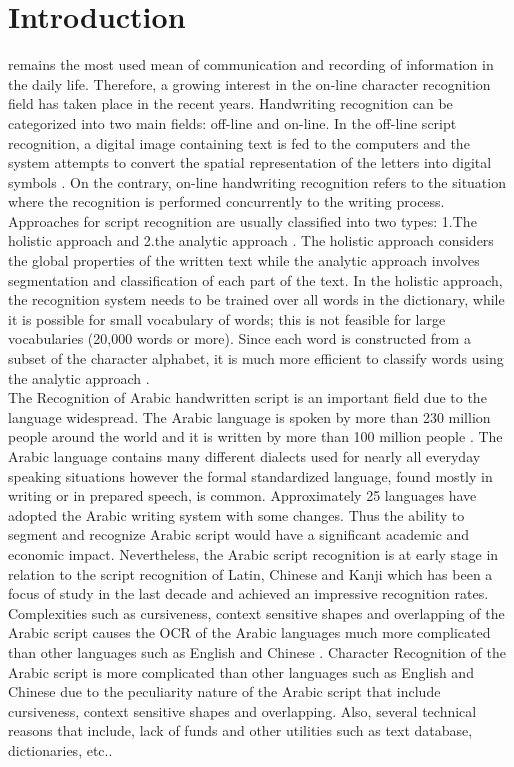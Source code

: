 \documentclass[journal,compsoc]{IEEEtran}
\begin{document}
\IEEEdisplaynotcompsoctitleabstractindextext

\section{Introduction}
\date
{} remains the most used mean of communication and recording of information in the daily life. Therefore, a growing interest in the on-line character recognition field has taken place in the recent years. Handwriting recognition can be categorized into two main fields: off-line and on-line. In the off-line script recognition, a digital image containing text is fed to the computers and the system attempts to convert the spatial representation of the letters into digital symbols \cite{al2011online}. On the contrary, on-line handwriting recognition refers to the situation where the recognition is performed concurrently to the writing process. Approaches for script recognition are usually classified into two types: 1.The holistic approach \cite{biadsy2011segmentation} and 2.the analytic approach \cite{abdulla2008off, sari2002off, Dinges2011, elanwar2012unconstrained}. The holistic approach considers the global properties of the written text while the analytic approach involves segmentation and classification of each part of the text.  In the holistic approach, the recognition system needs to be trained over all words in the dictionary, while it is possible for small vocabulary of words; this is not feasible for large vocabularies (20,000 words or more). Since each word is constructed from a subset of the character alphabet, it is much more efficient to classify words using the analytic approach \cite{elanwar2012unconstrained}.\\

The Recognition of Arabic handwritten script is an important field due to the language widespread. The Arabic language is spoken by more than 230 million people around the world and it is written by more than 100 million people \cite{al2011online}. The Arabic language contains many different dialects used for nearly all everyday speaking situations however the formal standardized language, found mostly in writing or in prepared speech, is common. Approximately 25 languages have adopted the Arabic writing system with some changes. Thus the ability to segment and recognize Arabic script would have a significant academic and economic impact. Nevertheless, the Arabic script recognition is at early stage in relation to the script recognition of Latin, Chinese and Kanji which has been a focus of study in the last decade and achieved an impressive recognition rates. Complexities such as cursiveness, context sensitive shapes and overlapping of the Arabic script causes the OCR of the Arabic languages much more complicated than other languages such as English and Chinese \cite{razzak2010locally}. 
Character Recognition of the Arabic script is more complicated than other languages such as English and Chinese due to the peculiarity nature of the Arabic script that include cursiveness, context sensitive shapes and overlapping. Also, several technical reasons that include, lack of funds and other utilities such as text database, dictionaries, etc.\cite{zeki2011segmentation}.\\
\end{document}
